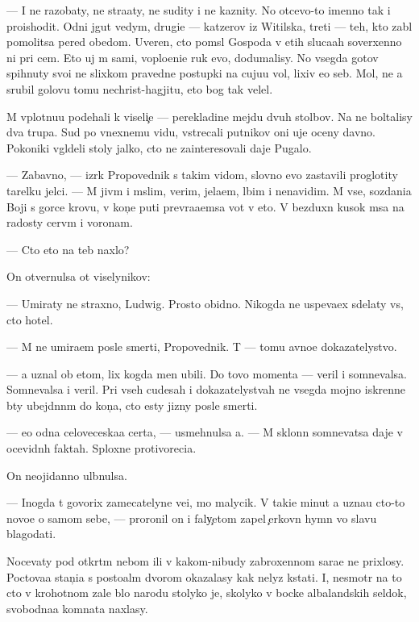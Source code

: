 \documentclass[10pt]{book}
\begin{document}
— I ne razob{\x}aty, ne stra{\x}aty, ne sudity i ne kaznity. No otcevo-to imenno tak i proishodit. Odni jgut vedym, drugi{\y}e — katzerov iz Witilska, tret{\y}i — teh, kto zab{\yi}l pomolitsa pered obedom. Uveren, cto pom{\yi}sl{\yi} Gospoda v etih sluca{\y}ah soverxenno ni pri cem. Eto uj m{\yi} sami, voplo{\x}eni{\y}e ruk {\y}evo, dodumalisy. No vsegda gotov{\yi} spihnuty svo{\y}i ne slixkom pravedn{\yi}{\y}e postupki na cuju{\y}u vol{\io}, lixiv {\y}e{\y}o seb{\ia}. Mol, ne {\y}a srubil golovu tomu nechrist{\io}-hagjitu, eto bog tak velel.

M{\yi} vplotnu{\y}u pod{\y}ehali k viseli{\c}e — perekladine mejdu dvuh stolbov. Na ne{\y} boltalisy dva trupa. Sud{\ia} po vnexnemu vidu, vstrecali putnikov oni uje oceny davno. Poko{\y}niki v{\yi}gl{\ia}deli stoly jalko, cto ne zainteresovali daje Pugalo.

— Zabavno, — izr{\e}k Pro\-po\-ved\-nik s takim vidom, slovno {\y}evo zastavili proglotity tarelku jelci. — M{\yi} jiv{\e}m i m{\yi}slim, verim, jela{\y}em, l{\io}bim i nenavidim. M{\yi} vse, sozdani{\y}a Boj{\y}i s gor{\ia}ce{\y} krov{\y}u, v kon{\c}e puti prevra{\x}a{\y}emsa vot v eto. V bezduxn{\yi}{\y} kusok m{\ia}sa na radosty cerv{\ia}m i voronam.

— Cto eto na teb{\ia} naxlo?

On otvernulsa ot viselynikov:

— Umiraty ne straxno, Ludwig. Prosto obidno. Nikogda ne uspeva{\y}ex sdelaty vs{\e}, cto hotel.

— M{\yi} ne umira{\y}em posle smerti, Pro\-po\-ved\-nik. T{\yi} — tomu {\y}avno{\y}e dokazatelystvo.

— {\Y}a uznal ob etom, lix kogda men{\ia} ubili. Do tovo momenta — veril i somnevalsa. Somnevalsa i veril. Pri vseh cudesah i dokazatelystvah ne vsegda mojno iskrenne b{\yi}ty ubejd{\e}nn{\yi}m do kon{\c}a, cto {\y}esty jizny posle smerti.

— {\Y}e{\x}o odna celoveceska{\y}a certa, — usmehnulsa {\y}a. — M{\yi} sklonn{\yi} somnevatsa daje v ocevidn{\yi}h faktah. Sploxn{\yi}{\y}e protivoreci{\y}a.

On neojidanno ul{\yi}bnulsa.

— Inogda t{\yi} govorix zamecatelyn{\yi}{\y}e ve{\x}i, mo{\y} malycik. V taki{\y}e minut{\yi} {\y}a uzna{\y}u cto-to novo{\y}e o samom sebe, — proronil on i faly{\c}etom zapel {\c}erkovn{\yi}{\y} hymn vo slavu blagodati.



Nocevaty pod otkr{\yi}t{\yi}m nebom ili v kakom-nibudy zabroxennom sara{\y}e ne pri\-xlosy. Poctova{\y}a stan{\c}i{\y}a s posto{\y}al{\yi}m dvorom okazalasy kak nelyz{\ia} kstati. I, ne\-smo\-tr{\ia} na to cto v krohotnom zale b{\yi}lo narodu stolyko je, skoly\-ko v bocke albalandskih sel{\e}dok, svobodna{\y}a komnata naxlasy.
\end{document}
